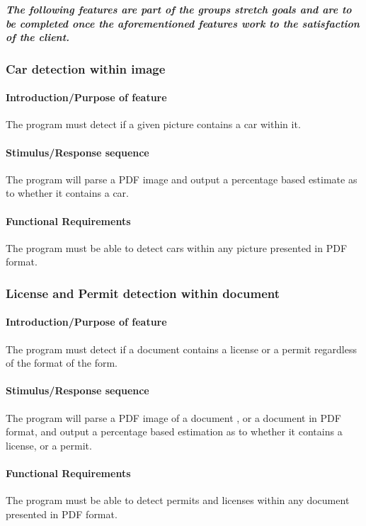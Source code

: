 \documentclass[onecolumn, draftclsnofoot,10pt, compsoc]{IEEEtran}
\begin{document}
\vspace{.75cm}
\textbf{\textit{The following features are part of the groups stretch goals and are to be completed once the aforementioned features work to the satisfaction of the client. 
}}
\vspace{.75cm}


\subsubsection{Car detection within image}\vspace{.5cm}

\hfill\begin{minipage}{\dimexpr\textwidth-1cm}
\paragraph{Introduction/Purpose of feature}
The program must detect if a given picture contains a car within it.
\paragraph{Stimulus/Response sequence}
The program will parse a PDF image and output a percentage based estimate as to whether it contains a car.
\paragraph{Functional Requirements}
The program must be able to detect cars within any picture presented in PDF format.
\end{minipage}
\vspace{.75cm}

\subsubsection{License and Permit detection within document}\vspace{.5cm}

\hfill\begin{minipage}{\dimexpr\textwidth-1cm}
\paragraph{Introduction/Purpose of feature}
The program must detect if a document contains a license or a permit regardless of the format of the form.
\paragraph{Stimulus/Response sequence}
The program will parse a PDF image of a document , or a document in PDF format, and output a percentage based estimation as to whether it contains a license, or a permit.
\paragraph{Functional Requirements}
The program must be able to detect permits and licenses within any document presented in PDF format.
\end{minipage}
\vspace{.75cm}
\end{document}
